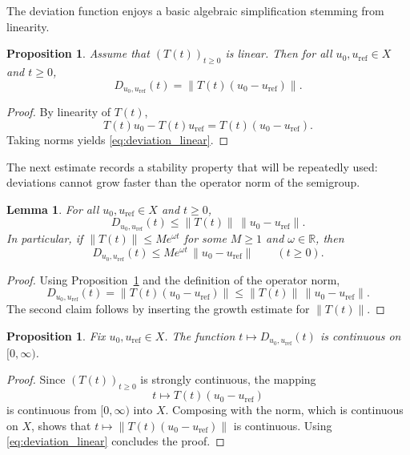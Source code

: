\documentclass[12pt]{article}
\newtheorem{lemma}[theorem]{Lemma}
\newtheorem{proposition}[theorem]{Proposition}
\begin{document}
The deviation function enjoys a basic algebraic simplification stemming from linearity.

\begin{proposition}\label{prop:deviation_linear_reduction}
Assume that $(T(t))_{t\ge 0}$ is linear. Then for all $u_0,u_{\mathrm{ref}}\in X$ and $t\ge 0$,
\begin{equation}\label{eq:deviation_linear}
D_{u_0,u_{\mathrm{ref}}}(t)
=\|T(t)(u_0-u_{\mathrm{ref}})\|.
\end{equation}
\end{proposition}

\begin{proof}
By linearity of $T(t)$,
\[
T(t)u_0-T(t)u_{\mathrm{ref}}
=T(t)(u_0-u_{\mathrm{ref}}).
\]
Taking norms yields \eqref{eq:deviation_linear}.
\end{proof}

The next estimate records a stability property that will be repeatedly used: deviations cannot grow faster than the operator norm of the semigroup.

\begin{lemma}\label{lem:deviation_bound}
For all $u_0,u_{\mathrm{ref}}\in X$ and $t\ge 0$,
\begin{equation}\label{eq:deviation_bound}
D_{u_0,u_{\mathrm{ref}}}(t)
\le \|T(t)\|\,\|u_0-u_{\mathrm{ref}}\|.
\end{equation}
In particular, if $\|T(t)\|\le M e^{\omega t}$ for some $M\ge 1$ and $\omega\in\mathbb{R}$, then
\[
D_{u_0,u_{\mathrm{ref}}}(t)\le M e^{\omega t}\,\|u_0-u_{\mathrm{ref}}\|
\qquad (t\ge 0).
\]
\end{lemma}

\begin{proof}
Using Proposition~\ref{prop:deviation_linear_reduction} and the definition of the operator norm,
\[
D_{u_0,u_{\mathrm{ref}}}(t)=\|T(t)(u_0-u_{\mathrm{ref}})\|
\le \|T(t)\|\,\|u_0-u_{\mathrm{ref}}\|.
\]
The second claim follows by inserting the growth estimate for $\|T(t)\|$.
\end{proof}

\begin{proposition}\label{prop:deviation_continuity}
Fix $u_0,u_{\mathrm{ref}}\in X$. The function $t\mapsto D_{u_0,u_{\mathrm{ref}}}(t)$ is continuous on $[0,\infty)$.
\end{proposition}

\begin{proof}
Since $(T(t))_{t\ge 0}$ is strongly continuous, the mapping
\[
t\longmapsto T(t)(u_0-u_{\mathrm{ref}})
\]
is continuous from $[0,\infty)$ into $X$. Composing with the norm, which is continuous on $X$, shows that $t\mapsto \|T(t)(u_0-u_{\mathrm{ref}})\|$ is continuous. Using \eqref{eq:deviation_linear} concludes the proof.
\end{proof}
\end{document}
